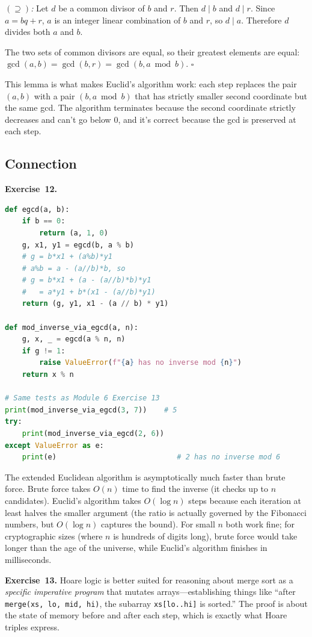 \documentclass[11pt]{article}
\begin{document}
\emph{$(\supseteq)$:} Let $d$ be a common divisor of $b$ and $r$. Then $d \mid b$ and $d \mid r$. Since $a = bq + r$, $a$ is an integer linear combination of $b$ and $r$, so $d \mid a$. Therefore $d$ divides both $a$ and $b$.

The two sets of common divisors are equal, so their greatest elements are equal: $\gcd(a, b) = \gcd(b, r) = \gcd(b, a \bmod b)$. \hfill$\square$

This lemma is what makes Euclid's algorithm work: each step replaces the pair $(a, b)$ with a pair $(b, a \bmod b)$ that has strictly smaller second coordinate but the same gcd. The algorithm terminates because the second coordinate strictly decreases and can't go below $0$, and it's correct because the gcd is preserved at each step.

\subsection*{Connection}

\textbf{Exercise~12.}
\begin{lstlisting}[language=Python]
def egcd(a, b):
    if b == 0:
        return (a, 1, 0)
    g, x1, y1 = egcd(b, a % b)
    # g = b*x1 + (a%b)*y1
    # a%b = a - (a//b)*b, so
    # g = b*x1 + (a - (a//b)*b)*y1
    #   = a*y1 + b*(x1 - (a//b)*y1)
    return (g, y1, x1 - (a // b) * y1)

def mod_inverse_via_egcd(a, n):
    g, x, _ = egcd(a % n, n)
    if g != 1:
        raise ValueError(f"{a} has no inverse mod {n}")
    return x % n

# Same tests as Module 6 Exercise 13
print(mod_inverse_via_egcd(3, 7))    # 5
try:
    print(mod_inverse_via_egcd(2, 6))
except ValueError as e:
    print(e)                            # 2 has no inverse mod 6
\end{lstlisting}
The extended Euclidean algorithm is asymptotically much faster than brute force. Brute force takes $O(n)$ time to find the inverse (it checks up to $n$ candidates). Euclid's algorithm takes $O(\log n)$ steps because each iteration at least halves the smaller argument (the ratio is actually governed by the Fibonacci numbers, but $O(\log n)$ captures the bound). For small $n$ both work fine; for cryptographic sizes (where $n$ is hundreds of digits long), brute force would take longer than the age of the universe, while Euclid's algorithm finishes in milliseconds.

\medskip
\textbf{Exercise~13.}
Hoare logic is better suited for reasoning about merge sort as a \emph{specific imperative program} that mutates arrays---establishing things like ``after \texttt{merge(xs, lo, mid, hi)}, the subarray \texttt{xs[lo..hi]} is sorted.'' The proof is about the state of memory before and after each step, which is exactly what Hoare triples express.
\end{document}
